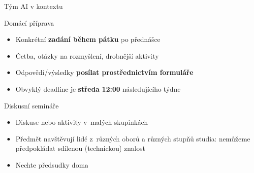 \documentclass[aspectratio=169,dvipsnames]{beamer}
\begin{document}
\begin{frame}{Tým AI v kontextu}
\end{frame}





\begin{frame}{Domácí příprava}

    \begin{itemize}[<+->]

        \item Konkrétní \textbf{zadání během pátku} po přednášce

        \item Četba, otázky na rozmyšlení, drobnější aktivity

        \item Odpovědi/výsledky \textbf{posílat prostřednictvím formuláře}

        \item Obvyklý deadline je \textbf{středa 12:00} následujícího týdne

    \end{itemize}

    \vspace{10pt}

    \centering

\end{frame}

\begin{frame}{Diskusní semináře}

\begin{itemize}

    \item Diskuse nebo aktivity v~malých skupinkách

    \item Předmět navštěvují lidé z~různých oborů a různých stupňů studia: nemůžeme předpokládat sdílenou (technickou) znalost    

    \item Nechte předsudky doma

\end{itemize}

\vspace{10pt}

\begin{center}
\end{center}

\end{frame}
\end{document}
